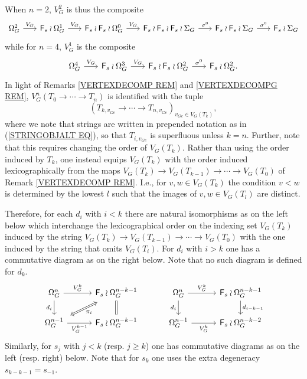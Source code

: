 \documentclass[a4paper,10pt]{article}%
\begin{document}
\begin{remark}\label{VGN REM}
When $n = 2$, $V_{G}^{2}$ is thus the composite
\[
\begin{tikzcd}[column sep =1.7em]
	\Omega_{G}^{2} \ar{r}{V_G} &
	\Fin_s \wr \Omega_{G}^{1} \ar{r}{V_G} &
	\Fin_s \wr \Fin_s \wr \Omega_{G}^{0} \ar{r}{V_G} &
	\Fin_s \wr \Fin_s \wr \Fin_s \wr \Sigma_{G} \ar{r}{\sigma^0} &
	\Fin_s \wr \Fin_s \wr \Sigma_{G} \ar{r}{\sigma^0} &
	\Fin_s \wr \Sigma_{G}
\end{tikzcd}
\]
while for $n=4$,  $V_{G}^{1}$ is the composite
\[
\begin{tikzcd}[column sep =1.7em]
	\Omega_{G}^{4} \ar{r}{V_G} &
	\Fin_s \wr \Omega_{G}^{3} \ar{r}{V_G} &
	\Fin_s \wr \Fin_s \wr \Omega_{G}^{2} \ar{r}{\sigma^0} &
	\Fin_s \wr \Omega_{G}^{2}.
\end{tikzcd}
\]
In light of Remarks \ref{VERTEXDECOMP REM} and \ref{VERTEXDECOMPG REM}, 
$V_{G}^{n}(T_0 \to \cdots \to T_n)$ is identified with the tuple 
\begin{equation}\label{VGNISO EQ}
	(T_{k,v_{G e}}\to \cdots \to T_{n,v_{G e}})_{v_{G e} \in V_G(T_k)},
\end{equation}
where we note that strings are written in prepended notation as in (\ref{STRINGOBJALT EQ}), so that $T_{i,v_{G e}}$ is superfluous unless $k=n$.
Further, note that this requires changing the order of $V_G(T_k)$.
Rather than using the order induced by $T_k$, one instead equips 
$V_G(T_k)$ with the order induced lexicographically
from the maps 
$V_G(T_k) \to V_G(T_{k-1}) \to \cdots \to V_G(T_0)$ 
of Remark \ref{VERTEXDECOMP REM}. I.e., for 
$v,w \in V_G(T_k)$ the condition $v<w$ is determined by the lowest $l$ such that the images of $v,w \in V_G(T_l)$ are distinct.

Therefore, for each $d_i$ with $i < k$ there are natural isomorphisms as on the left below which interchange the
lexicographical order on the indexing set $V_G(T_k)$
induced by the string
$V_G(T_k) \to V_G(T_{k-1}) \to \cdots \to V_G(T_0)$ 
with the one induced by the string that omits $V_G(T_i)$.
For $d_i$ with $i>k$ one has a commutative diagram as on the right below.
Note that no such diagram is defined for $d_k$.
\begin{equation}\label{PIIDEFDI EQ}
\begin{tikzcd}[row sep=1.7em,column sep = 3em]
	\Omega_{G}^{n} \ar{d}[swap]{d_{i}} \ar{r}{V_G^k} &
	|[alias=F1]|
	\Fin_s \wr \Omega_{G}^{n-k-1}
	\ar[equal]{d} 
&
	\Omega_{G}^{n} \ar{d}[swap]{d_{i}} \ar{r}{V_G^k} &
	\Fin_s \wr \Omega_{G}^{n-k-1}
	\ar{d}{d_{i-k-1}} 
\\
	|[alias=G2]|
	\Omega_{G}^{n-1} \ar{r}[swap]{V_G^{k-1}}&
	\Fin_s \wr \Omega_{G}^{n-k-1}  
&
	\Omega_{G}^{n-1} \ar{r}[swap]{V_G^{k}}&
	\Fin_s \wr \Omega_{G}^{n-k-2}  
\arrow[Leftrightarrow, from=F1, to=G2,shorten >=0.15cm,shorten <=0.15cm,"\pi_{i}"]
\end{tikzcd}
\end{equation}
Similarly, for $s_j$ with $j<k$ (resp. $j \geq k$) one
has commutative diagrams as on the left (resp. right) below. Note that for $s_k$ one uses the extra degeneracy 
$s_{k-k-1}=s_{-1}$.


\end{remark}
\end{document}
